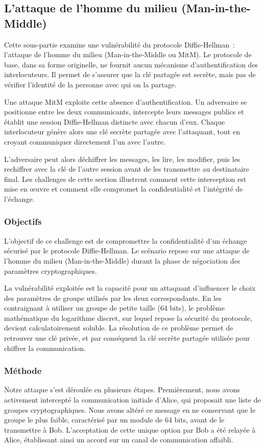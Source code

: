 \documentclass[12pt, a4paper]{article}
\begin{document}
    \subsection{L'attaque de l'homme du milieu (Man-in-the-Middle)}
    Cette sous-partie examine une vulnérabilité du protocole Diffie-Hellman~:
    l'attaque de l'homme du milieu (Man-in-the-Middle ou MitM). Le protocole de
    base, dans sa forme originelle, ne fournit aucun mécanisme d'authentification
    des interlocuteurs. Il permet de s'assurer que la clé partagée est secrète,
    mais pas de vérifier l'identité de la personne avec qui on la partage.

    Une attaque MitM exploite cette absence d'authentification. Un adversaire
    se positionne entre les deux communicants, intercepte leurs messages publics
    et établit une session Diffie-Hellman distincte avec chacun d'eux. Chaque
    interlocuteur génère alors une clé secrète partagée avec l'attaquant, tout
    en croyant communiquer directement l'un avec l'autre.

    L'adversaire peut alors déchiffrer les messages, les lire, les modifier, puis
    les rechiffrer avec la clé de l'autre session avant de les transmettre au
    destinataire final. Les challenges de cette section illustrent comment
    cette interception est mise en œuvre et comment elle compromet la
    confidentialité et l'intégrité de l'échange.

    \subsubsection{Objectifs}
    L'objectif de ce challenge est de compromettre la confidentialité d'un
    échange sécurisé par le protocole Diffie-Hellman. Le scénario repose sur
    une attaque de l'homme du milieu (Man-in-the-Middle) durant la phase de
    négociation des paramètres cryptographiques.

    La vulnérabilité exploitée est la capacité pour un attaquant d'influencer
    le choix des paramètres de groupe utilisés par les deux correspondants. En
    les contraignant à utiliser un groupe de petite taille (64 bits), le
    problème mathématique du logarithme discret, sur lequel repose la sécurité
    du protocole, devient calculatoirement soluble. La résolution de ce
    problème permet de retrouver une clé privée, et par conséquent la clé
    secrète partagée utilisée pour chiffrer la communication.

    \subsubsection{Méthode}
    Notre attaque s'est déroulée en plusieurs étapes. Premièrement, nous avons
    activement intercepté la communication initiale d'Alice, qui proposait une
    liste de groupes cryptographiques. Nous avons altéré ce message en ne
    conservant que le groupe le plus faible, caractérisé par un module de 64
    bits, avant de le transmettre à Bob. L'acceptation de cette unique option
    par Bob a été relayée à Alice, établissant ainsi un accord sur un canal de
    communication affaibli.
\end{document}

